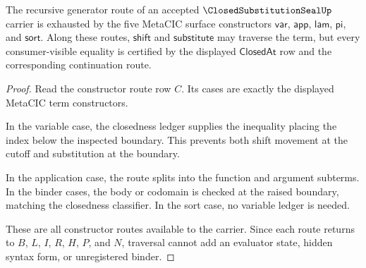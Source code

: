 \begin{theorem}
\label{thm:closed-substitution-seal-recursive-generator-route}
The recursive generator route of an accepted $\ClosedSubstitutionSealUp$ carrier is exhausted by the five MetaCIC surface constructors $\mathsf{var}$, $\mathsf{app}$, $\mathsf{lam}$, $\mathsf{pi}$, and $\mathsf{sort}$. Along these routes, $\mathsf{shift}$ and $\mathsf{substitute}$ may traverse the term, but every consumer-visible equality is certified by the displayed $\mathsf{ClosedAt}$ row and the corresponding continuation route.
\end{theorem}
\begin{proof}
Read the constructor route row $C$. Its cases are exactly the displayed MetaCIC term constructors.

In the variable case, the closedness ledger supplies the inequality placing the index below the inspected boundary. This prevents both shift movement at the cutoff and substitution at the boundary.

In the application case, the route splits into the function and argument subterms. In the binder cases, the body or codomain is checked at the raised boundary, matching the closedness classifier. In the sort case, no variable ledger is needed.

These are all constructor routes available to the carrier. Since each route returns to $B$, $L$, $I$, $R$, $H$, $P$, and $N$, traversal cannot add an evaluator state, hidden syntax form, or unregistered binder.
\end{proof}

